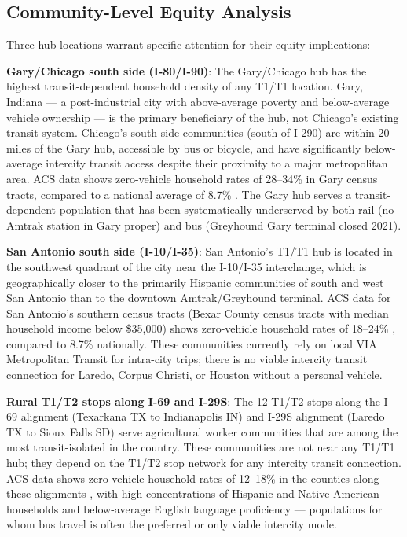 \subsection{Community-Level Equity Analysis}

Three hub locations warrant specific attention for their equity implications:

\textbf{Gary/Chicago south side (I-80/I-90)}: The Gary/Chicago hub has the highest transit-dependent household density of any T1/T1 location. Gary, Indiana --- a post-industrial city with above-average poverty and below-average vehicle ownership --- is the primary beneficiary of the hub, not Chicago's existing transit system. Chicago's south side communities (south of I-290) are within 20 miles of the Gary hub, accessible by bus or bicycle, and have significantly below-average intercity transit access despite their proximity to a major metropolitan area. ACS data shows zero-vehicle household rates of 28--34\% in Gary census tracts, compared to a national average of 8.7\% \citep{ACS_B08201_2022}. The Gary hub serves a transit-dependent population that has been systematically underserved by both rail (no Amtrak station in Gary proper) and bus (Greyhound Gary terminal closed 2021).

\textbf{San Antonio south side (I-10/I-35)}: San Antonio's T1/T1 hub is located in the southwest quadrant of the city near the I-10/I-35 interchange, which is geographically closer to the primarily Hispanic communities of south and west San Antonio than to the downtown Amtrak/Greyhound terminal. ACS data for San Antonio's southern census tracts (Bexar County census tracts with median household income below \$35,000) shows zero-vehicle household rates of 18--24\% \citep{ACS_B08201_2022}, compared to 8.7\% nationally. These communities currently rely on local VIA Metropolitan Transit for intra-city trips; there is no viable intercity transit connection for Laredo, Corpus Christi, or Houston without a personal vehicle.

\textbf{Rural T1/T2 stops along I-69 and I-29S}: The 12 T1/T2 stops along the I-69 alignment (Texarkana TX to Indianapolis IN) and I-29S alignment (Laredo TX to Sioux Falls SD) serve agricultural worker communities that are among the most transit-isolated in the country. These communities are not near any T1/T1 hub; they depend on the T1/T2 stop network for any intercity transit connection. ACS data shows zero-vehicle household rates of 12--18\% in the counties along these alignments \citep{ACS_B08201_2022}, with high concentrations of Hispanic and Native American households and below-average English language proficiency --- populations for whom bus travel is often the preferred or only viable intercity mode.

